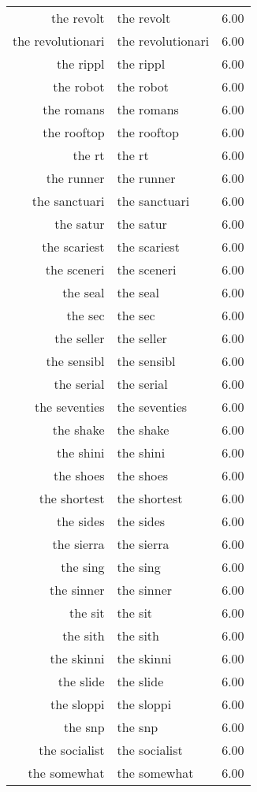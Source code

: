\begin{table}[ht]
\begin{tabular}{rlr}
  the revolt & the revolt & 6.00 \\ 
  the revolutionari & the revolutionari & 6.00 \\ 
  the rippl & the rippl & 6.00 \\ 
  the robot & the robot & 6.00 \\ 
  the romans & the romans & 6.00 \\ 
  the rooftop & the rooftop & 6.00 \\ 
  the rt & the rt & 6.00 \\ 
  the runner & the runner & 6.00 \\ 
  the sanctuari & the sanctuari & 6.00 \\ 
  the satur & the satur & 6.00 \\ 
  the scariest & the scariest & 6.00 \\ 
  the sceneri & the sceneri & 6.00 \\ 
  the seal & the seal & 6.00 \\ 
  the sec & the sec & 6.00 \\ 
  the seller & the seller & 6.00 \\ 
  the sensibl & the sensibl & 6.00 \\ 
  the serial & the serial & 6.00 \\ 
  the seventies & the seventies & 6.00 \\ 
  the shake & the shake & 6.00 \\ 
  the shini & the shini & 6.00 \\ 
  the shoes & the shoes & 6.00 \\ 
  the shortest & the shortest & 6.00 \\ 
  the sides & the sides & 6.00 \\ 
  the sierra & the sierra & 6.00 \\ 
  the sing & the sing & 6.00 \\ 
  the sinner & the sinner & 6.00 \\ 
  the sit & the sit & 6.00 \\ 
  the sith & the sith & 6.00 \\ 
  the skinni & the skinni & 6.00 \\ 
  the slide & the slide & 6.00 \\ 
  the sloppi & the sloppi & 6.00 \\ 
  the snp & the snp & 6.00 \\ 
  the socialist & the socialist & 6.00 \\ 
  the somewhat & the somewhat & 6.00 \\ 

\end{tabular}
\end{table}
